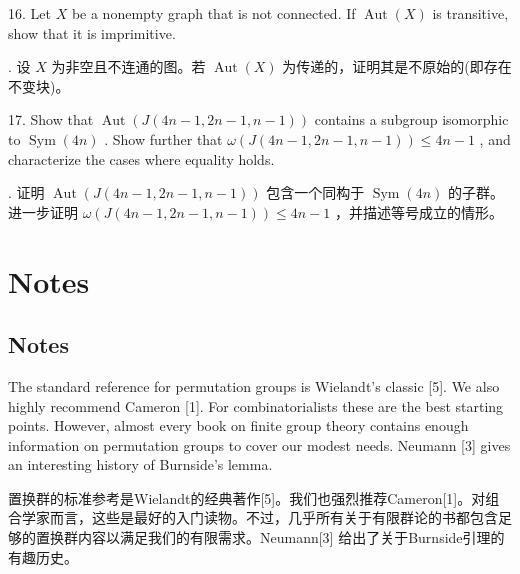 \documentclass[10pt]{article}
\begin{document}
16. Let \(X\) be a nonempty graph that is not connected. If \(\operatorname{Aut}\left( X\right)\) is transitive, show that it is imprimitive.

\begin{tcolorbox}. 设 \(X\) 为非空且不连通的图。若 \(\operatorname{Aut}\left( X\right)\) 为传递的，证明其是不原始的(即存在不变块)。
\end{tcolorbox}

17. Show that \(\operatorname{Aut}\left( {J\left( {{4n} - 1,{2n} - 1,n - 1}\right) }\right)\) contains a subgroup isomorphic to \(\operatorname{Sym}\left( {4n}\right)\) . Show further that \(\omega \left( {J\left( {{4n} - 1,{2n} - 1,n - 1}\right) }\right)  \leq  {4n} - 1\) , and characterize the cases where equality holds.

\begin{tcolorbox}. 证明 \(\operatorname{Aut}\left( {J\left( {{4n} - 1,{2n} - 1,n - 1}\right) }\right)\) 包含一个同构于 \(\operatorname{Sym}\left( {4n}\right)\) 的子群。进一步证明 \(\omega \left( {J\left( {{4n} - 1,{2n} - 1,n - 1}\right) }\right)  \leq  {4n} - 1\) ，并描述等号成立的情形。
\end{tcolorbox}

\section*{Notes}

\begin{tcolorbox}\relax
\section*{Notes}
\end{tcolorbox}

The standard reference for permutation groups is Wielandt's classic [5]. We also highly recommend Cameron [1]. For combinatorialists these are the best starting points. However, almost every book on finite group theory contains enough information on permutation groups to cover our modest needs. Neumann [3] gives an interesting history of Burnside's lemma.

\begin{tcolorbox}\relax
置换群的标准参考是Wielandt的经典著作[5]。我们也强烈推荐Cameron[1]。对组合学家而言，这些是最好的入门读物。不过，几乎所有关于有限群论的书都包含足够的置换群内容以满足我们的有限需求。Neumann[3] 给出了关于Burnside引理的有趣历史。
\end{tcolorbox}
\end{document}
